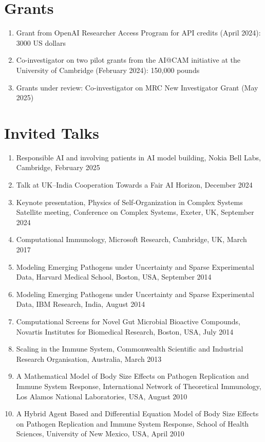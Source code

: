 \documentclass[11pt,a4paper]{article}
\begin{document}
\section*{Grants}
\begin{enumerate}
  \item Grant from OpenAI Researcher Access Program for API credits (April 2024): 3000 US dollars
  \item Co-investigator on two pilot grants from the AI@CAM initiative at the University of Cambridge (February 2024): 150,000 pounds
  \item Grants under review: Co-investigator on MRC New Investigator Grant (May 2025)
\end{enumerate}

\section*{Invited Talks}
\begin{enumerate}
  \item Responsible AI and involving patients in AI model building, Nokia Bell Labs, Cambridge, February 2025
  \item Talk at UK--India Cooperation Towards a Fair AI Horizon, December 2024
  \item Keynote presentation, Physics of Self-Organization in Complex Systems Satellite meeting, Conference on Complex Systems, Exeter, UK, September 2024
  \item Computational Immunology, Microsoft Research, Cambridge, UK, March 2017
  \item Modeling Emerging Pathogens under Uncertainty and Sparse Experimental Data, Harvard Medical School, Boston, USA, September 2014
  \item Modeling Emerging Pathogens under Uncertainty and Sparse Experimental Data, IBM Research, India, August 2014
  \item Computational Screens for Novel Gut Microbial Bioactive Compounds, Novartis Institutes for Biomedical Research, Boston, USA, July 2014
  \item Scaling in the Immune System, Commonwealth Scientific and Industrial Research Organisation, Australia, March 2013
  \item A Mathematical Model of Body Size Effects on Pathogen Replication and Immune System Response, International Network of Theoretical Immunology, Los Alamos National Laboratories, USA, August 2010
  \item A Hybrid Agent Based and Differential Equation Model of Body Size Effects on Pathogen Replication and Immune System Response, School of Health Sciences, University of New Mexico, USA, April 2010
\end{enumerate}
\end{document}
